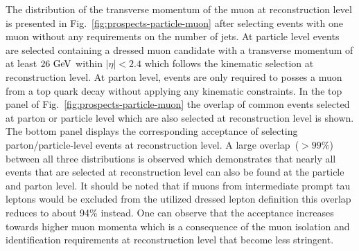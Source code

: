 The distribution of the transverse momentum of the muon at reconstruction level is presented in Fig.~\ref{fig:prospects-particle-muon} after selecting events with one muon without any requirements on the number of jets. At particle level events are selected containing a dressed muon candidate with a transverse momentum of at least $26~\textrm{GeV}$ within $|\eta|<2.4$ which follows the kinematic selection at reconstruction level. At parton level, events are only required to posses a muon from a top quark decay without applying any kinematic constraints. In the top panel of Fig.~\ref{fig:prospects-particle-muon} the overlap of common events selected at parton or particle level which are also selected at reconstruction level is shown. The bottom panel displays the corresponding acceptance of selecting parton/particle-level events at reconstruction level. A large overlap~($>99\%$) between all three distributions is observed which demonstrates that nearly all events that are selected at reconstruction level can also be found at the particle and parton level. It should be noted that if muons from intermediate prompt tau leptons would be excluded from the utilized dressed lepton definition this overlap reduces to about 94\% instead. One can observe that the acceptance increases towards higher muon momenta which is a consequence of the muon isolation and identification requirements at reconstruction level that become less stringent. 


